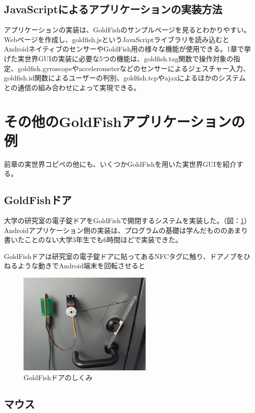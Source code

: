 \subsection{JavaScriptによるアプリケーションの実装方法}
アプリケーションの実装は、GoldFishのサンプルページ\cite{sample}を見るとわかりやすい。Webページを作成し、goldfish.jsというJavaScriptライブラリを読み込むとAndroidネイティブのセンサーやGoldFish用の様々な機能が使用できる。1章で挙げた実世界GUIの実装に必要な5つの機能は、goldfish.tag関数で操作対象の指定、goldfish.gyroscopeやaccelerometerなどのセンサーによるジェスチャー入力、goldfish.id関数によるユーザーの判別、goldfish.tcpやajaxによるほかのシステムとの通信の組み合わせによって実現できる。


\section{その他のGoldFishアプリケーションの例}
前章の実世界コピペの他にも、いくつかGoldFishを用いた実世界GUIを紹介する。

\subsection{GoldFishドア}
大学の研究室の電子錠ドアをGoldFishで開閉するシステムを実装した。（図：\ref{fig:door}）Androidアプリケーション側の実装は、プログラムの基礎は学んだもののあまり書いたことのない大学3年生でも6時間ほどで実装できた。

GoldFishドアは研究室の電子錠ドアに貼ってあるNFCタグに触り、ドアノブをひねるような動きでAndroid端末を回転させると

\begin{figure}
  \begin{center}
    \includegraphics[height=50mm]{img/door.png}
  \end{center}
  \caption{GoldFishドアのしくみ}
  \label{fig:door}
\end{figure}


\subsection{マウス}

